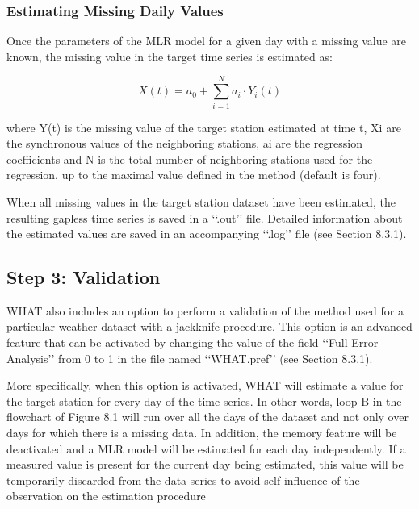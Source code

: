 \documentclass[ARTICLETHERMIC.tex]{subfiles}
\begin{document}
\subsubsection{Estimating Missing Daily Values}

Once the parameters of the MLR model for a given day with a missing value are known, the missing value in the target time series is estimated as:

\begin{equation}
    X(t) = a_0 + \sum_{i=1}^{N} a_i \cdot Y_i(t)
\end{equation}

where Y(t) is the missing value of the target station estimated at time t, Xi are the synchronous values of the neighboring stations, ai are the regression coefficients and N is the total number of neighboring stations used for the regression, up to the maximal value defined in the method (default is four).

When all missing values in the target station dataset have been estimated, the resulting gapless time series is saved in a ‘‘.out’’ file. Detailed information about the estimated values are saved in an accompanying ‘‘.log’’ file (see Section 8.3.1).

\subsection{Step 3: Validation}

WHAT also includes an option to perform a validation of the method used for a particular weather dataset with a jackknife procedure. This option is an advanced feature that can be activated by changing the value of the field ‘‘Full Error Analysis’’ from 0 to 1 in the file named ‘‘WHAT.pref’’ (see Section 8.3.1).

More specifically, when this option is activated, WHAT will estimate a value for the target station for every day of the time series. In other words, loop B in the flowchart of Figure 8.1 will run over all the days of the dataset and not only over days for which there is a missing data. In addition, the memory feature will be deactivated and a MLR model will be estimated for each day independently. If a measured value is present for the current day being estimated, this value will be temporarily discarded from the data series to avoid self-influence of the observation on the estimation procedure
\end{document}
